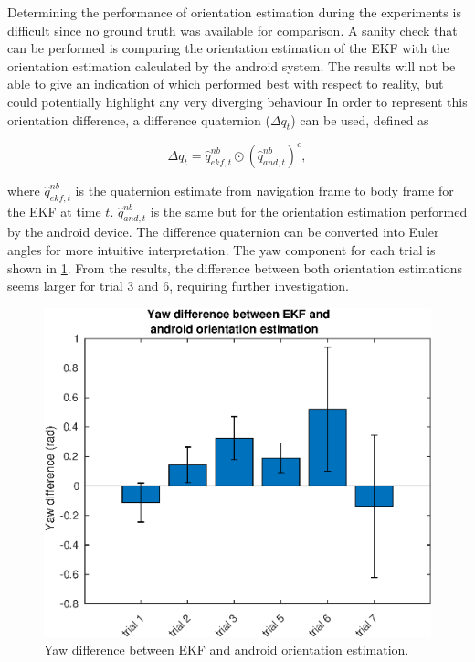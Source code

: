 Determining the performance of orientation estimation during the experiments is difficult since no ground truth was available for comparison. A sanity check that can be performed is comparing the orientation estimation of the EKF with the orientation estimation calculated by the android system. The results will not be able to give an indication of which performed best with respect to reality, but could potentially highlight any very diverging behaviour In order to represent this orientation difference, a difference quaternion ($	\Delta q_t$) can be used, defined as \cite{Kok2017}

\begin{equation}
	\Delta q_t = \hat{q}_{ekf,t}^{nb} \odot \left( \hat{q}_{and,t}^{nb}  \right)^c,
\end{equation} 

where $\hat{q}_{ekf,t}^{nb}$ is the quaternion estimate from navigation frame to body frame for the EKF at time $t$. $\hat{q}_{and,t}^{nb}$ is the same but for the orientation estimation performed by the android device. The difference quaternion can be converted into Euler angles for more intuitive interpretation. The yaw component for each trial is shown in  \cref{fig:yaw_difference_between_android_and_ekf_1}. From the results, the difference between both orientation estimations seems larger for trial 3 and 6, requiring further investigation.

\begin{figure}[H]
	\centering
	\includegraphics[width=0.7\linewidth]{images/20201118_1616_yaw_difference_between_android_and_EKF_1}
	\setlength{\belowcaptionskip}{-20pt}
	\caption{Yaw difference between EKF and android orientation estimation.}
	\label{fig:yaw_difference_between_android_and_ekf_1}
\end{figure}

